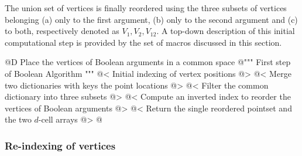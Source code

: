\documentclass[11pt,oneside]{article}	%
\begin{document}
The union set of vertices is finally reordered using the three subsets of vertices belonging (a) only to the first argument, (b) only to the second argument and (c) to both, respectively denoted as $V_1, V_2, V_{12}$. A top-down description of this initial computational step is provided by the set of macros discussed in this section.

@D Place the vertices of Boolean arguments in a common space
@{""" First step of Boolean Algorithm """
@< Initial indexing of vertex positions @>
@< Merge two dictionaries with keys the point locations @>
@< Filter the common dictionary into three subsets @>
@< Compute an inverted index to reorder the vertices of Boolean arguments @>
@< Return the single reordered pointset and the two $d$-cell arrays @>
@}

\subsubsection{Re-indexing of vertices}
\end{document}
